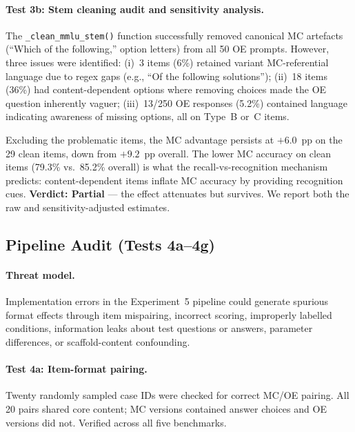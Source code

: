 \paragraph{Test 3b: Stem cleaning audit and sensitivity analysis.}
The \texttt{\_clean\_mmlu\_stem()} function successfully removed canonical MC
artefacts (``Which of the following,'' option letters) from all 50 OE prompts.
However, three issues were identified: (i)~3 items (6\%) retained variant
MC-referential language due to regex gaps (e.g., ``Of the following
solutions''); (ii)~18 items (36\%) had content-dependent options where removing
choices made the OE question inherently vaguer; (iii)~13/250 OE responses
(5.2\%) contained language indicating awareness of missing options, all on
Type~B or~C items.

Excluding the problematic items, the MC advantage persists at $+6.0$~pp on
the 29 clean items, down from $+9.2$~pp overall.  The lower MC accuracy on
clean items (79.3\% vs.\ 85.2\% overall) is what the recall-vs-recognition
mechanism predicts: content-dependent items inflate MC accuracy by providing
recognition cues.
\textbf{Verdict: Partial} --- the effect attenuates but survives.  We
report both the raw and sensitivity-adjusted estimates.



\subsection{Pipeline Audit (Tests 4a--4g)}
\label{app:val-pipeline}

\paragraph{Threat model.}
Implementation errors in the Experiment~5 pipeline could generate
spurious format effects through item mispairing, incorrect scoring,
improperly labelled conditions, information leaks about test questions
or answers, parameter differences, or scaffold-content confounding.

\paragraph{Test 4a: Item-format pairing.}
Twenty randomly sampled case IDs were checked for correct MC/OE pairing.  All
20 pairs shared core content; MC versions contained answer choices and OE
versions did not.  Verified across all five benchmarks.

